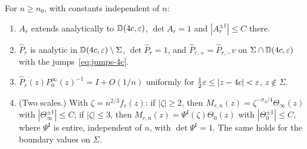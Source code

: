 \begin{lemma}\label{lem:airy}
For $n\ge n_0$, with constants independent of $n$:
\begin{enumerate}
\item[(i)] $A_r$ extends analytically to $\mathbb D(4c,\varepsilon)$, $\det A_r=1$ and $|A_r^{\pm1}|\le C$ there.
\item[(ii)] $\hat P_r$ is analytic in $\mathbb D(4c,\varepsilon)\setminus\Sigma$, $\det\hat P_r=1$, and $\hat P_{r,+}=\hat P_{r,-}v$ on
  $\Sigma\cap \mathbb D(4c,\varepsilon)$ with the jumps~\eqref{eq:jumps-4c}.
\item[(iii)] $\hat P_r(z)P^\infty_0(z)^{-1}=I+O(1/n)$ uniformly for $\frac12\varepsilon\le|z-4c|<\varepsilon$, $z\notin\Sigma$.
\item[(iv)] (Two scales.) With $\zeta=n^{2/3}f_r(z)$: if $|\zeta|\ge2$, then $M_{r,n}(z)=\zeta^{-\sigma_3/4}\Theta_\infty(z)$
  with $|\Theta_\infty^{\pm1}|\le C$; if $|\zeta|\le3$, then $M_{r,n}(z)=\Psi^{\mathrm I}(\zeta)\Theta_0(z)$ with
  $|\Theta_0^{\pm1}|\le C$, where $\Psi^{\mathrm I}$ is entire, independent of $n$, with $\det\Psi^{\mathrm I}=1$. The
  same holds for the boundary values on $\Sigma$.
\end{enumerate}
\end{lemma}


